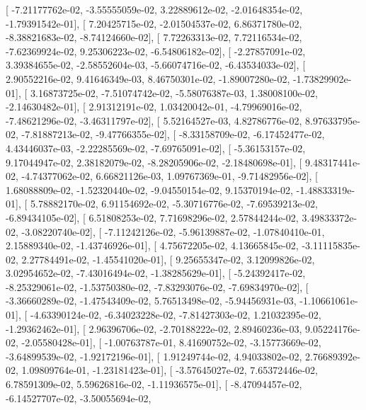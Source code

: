 \documentclass{article}
\begin{document}
       [ -7.21177762e-02,  -3.55555059e-02,   3.22889612e-02,
         -2.01648354e-02,  -1.79391542e-01],
       [  7.20425715e-02,  -2.01504537e-02,   6.86371780e-02,
         -8.38821683e-02,  -8.74124660e-02],
       [  7.72263313e-02,   7.72116534e-02,  -7.62369924e-02,
          9.25306223e-02,  -6.54806182e-02],
       [ -2.27857091e-02,   3.39384655e-02,  -2.58552604e-03,
         -5.66074716e-02,  -6.43534033e-02],
       [  2.90552216e-02,   9.41646349e-03,   8.46750301e-02,
         -1.89007280e-02,  -1.73829902e-01],
       [  3.16873725e-02,  -7.51074742e-02,  -5.58076387e-03,
          1.38008100e-02,  -2.14630482e-01],
       [  2.91312191e-02,   1.03420042e-01,  -4.79969016e-02,
         -7.48621296e-02,  -3.46311797e-02],
       [  5.52164527e-03,   4.82786776e-02,   8.97633795e-02,
         -7.81887213e-02,  -9.47766355e-02],
       [ -8.33158709e-02,  -6.17452477e-02,   4.43446037e-03,
         -2.22285569e-02,  -7.69765091e-02],
       [ -5.36153157e-02,   9.17044947e-02,   2.38182079e-02,
         -8.28205906e-02,  -2.18480698e-01],
       [  9.48317441e-02,  -4.74377062e-02,   6.66821126e-03,
          1.09767369e-01,  -9.71482956e-02],
       [  1.68088809e-02,  -1.52320440e-02,  -9.04550154e-02,
          9.15370194e-02,  -1.48833319e-01],
       [  5.78882170e-02,   6.91154692e-02,  -5.30716776e-02,
         -7.69539213e-02,  -6.89434105e-02],
       [  6.51808253e-02,   7.71698296e-02,   2.57844244e-02,
          3.49833372e-02,  -3.08220740e-02],
       [ -7.11242126e-02,  -5.96139887e-02,  -1.07840410e-01,
          2.15889340e-02,  -1.43746926e-01],
       [  4.75672205e-02,   4.13665845e-02,  -3.11115835e-02,
          2.27784491e-02,  -1.45541020e-01],
       [  9.25655347e-02,   3.12099826e-02,   3.02954652e-02,
         -7.43016494e-02,  -1.38285629e-01],
       [ -5.24392417e-02,  -8.25329061e-02,  -1.53750380e-02,
         -7.83293076e-02,  -7.69834970e-02],
       [ -3.36660289e-02,  -1.47543409e-02,   5.76513498e-02,
         -5.94456931e-03,  -1.10661061e-01],
       [ -4.63390124e-02,  -6.34023228e-02,  -7.81427303e-02,
          1.21032395e-02,  -1.29362462e-01],
       [  2.96396706e-02,  -2.70188222e-02,   2.89460236e-03,
          9.05224176e-02,  -2.05580428e-01],
       [ -1.00763787e-01,   8.41690752e-02,  -3.15773669e-02,
         -3.64899539e-02,  -1.92172196e-01],
       [  1.91249744e-02,   4.94033802e-02,   2.76689392e-02,
          1.09809764e-01,  -1.23181423e-01],
       [ -3.57645027e-02,   7.65372446e-02,   6.78591309e-02,
          5.59626816e-02,  -1.11936575e-01],
       [ -8.47094457e-02,  -6.14527707e-02,  -3.50055694e-02,
\end{document}

